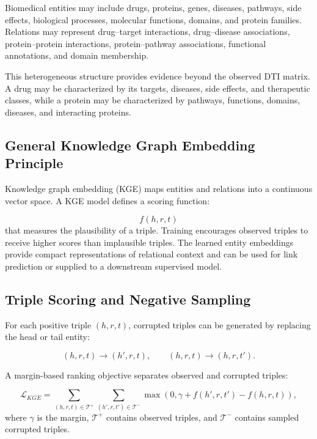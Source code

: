 Biomedical entities may include drugs, proteins, genes, diseases, pathways,
side effects, biological processes, molecular functions, domains, and protein
families. Relations may represent drug--target interactions, drug--disease
associations, protein--protein interactions, protein--pathway associations,
functional annotations, and domain membership.

This heterogeneous structure provides evidence beyond the observed DTI
matrix. A drug may be characterized by its targets, diseases, side effects,
and therapeutic classes, while a protein may be characterized by pathways,
functions, domains, diseases, and interacting proteins.

\subsection{General Knowledge Graph Embedding Principle}

Knowledge graph embedding (KGE) maps entities and relations into a continuous
vector space. A KGE model defines a scoring function:

\begin{equation}
    f(h,r,t)
\end{equation}
that measures the plausibility of a triple. Training encourages observed
triples to receive higher scores than implausible triples. The learned entity
embeddings provide compact representations of relational context and can be
used for link prediction or supplied to a downstream supervised model.

\subsection{Triple Scoring and Negative Sampling}

For each positive triple $(h,r,t)$, corrupted triples can be generated by
replacing the head or tail entity:

\begin{equation}
    (h,r,t)
    \rightarrow
    (h',r,t),
    \qquad
    (h,r,t)
    \rightarrow
    (h,r,t').
\end{equation}

A margin-based ranking objective separates observed and corrupted triples:

\begin{equation}
    \mathcal{L}_{KGE}
    =
    \sum_{(h,r,t)\in\mathcal{T}^{+}}
    \sum_{(h',r,t')\in\mathcal{T}^{-}}
    \max
    \left(
        0,
        \gamma
        +f(h',r,t')
        -f(h,r,t)
    \right),
    \label{eq:background_kge_loss}
\end{equation}
where $\gamma$ is the margin, $\mathcal{T}^{+}$ contains observed triples,
and $\mathcal{T}^{-}$ contains sampled corrupted triples.

